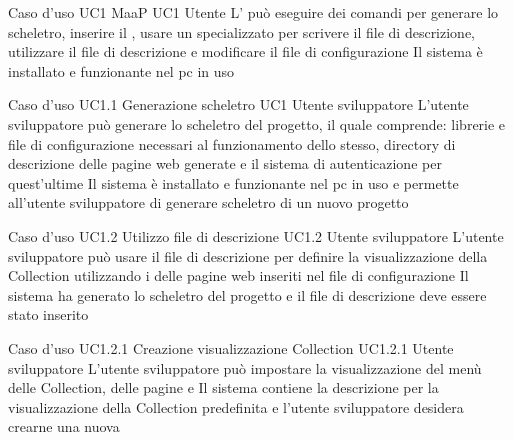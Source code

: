 

\UCtitle
{Caso d'uso UC1}
{MaaP}
\UC
{UC1}
{Utente }
{L'  può eseguire dei comandi per generare lo scheletro, inserire il , usare un  specializzato per scrivere il file di descrizione, utilizzare il file di descrizione e modificare il file di configurazione}
{Il sistema è installato e funzionante nel pc in uso}

\UCtitle
{Caso d'uso UC1.1}
{Generazione scheletro}
\UC
{UC1}
{Utente sviluppatore}
{L'utente sviluppatore può generare lo scheletro del progetto, il quale comprende: librerie e file di configurazione necessari al funzionamento dello stesso, directory di descrizione delle pagine web generate e il sistema di autenticazione per quest'ultime}
{Il sistema è installato e funzionante nel pc in uso e permette all'utente sviluppatore di generare scheletro di un nuovo progetto}



\UCtitle
{Caso d'uso UC1.2}
{Utilizzo file di descrizione}
\UC
{UC1.2}
{Utente sviluppatore}
{L'utente sviluppatore  può usare il file di descrizione per definire la visualizzazione della Collection utilizzando i  delle pagine web inseriti nel file di configurazione}
{Il sistema ha generato lo scheletro del progetto e il file di descrizione deve essere stato inserito}

\UCtitle
{Caso d'uso UC1.2.1}
{Creazione visualizzazione Collection}
\UC
{UC1.2.1}
{Utente sviluppatore}
{L'utente sviluppatore  può impostare la visualizzazione del menù delle Collection, delle pagine  e }
{Il sistema contiene la descrizione per la visualizzazione della Collection predefinita e l'utente sviluppatore desidera crearne una nuova}

